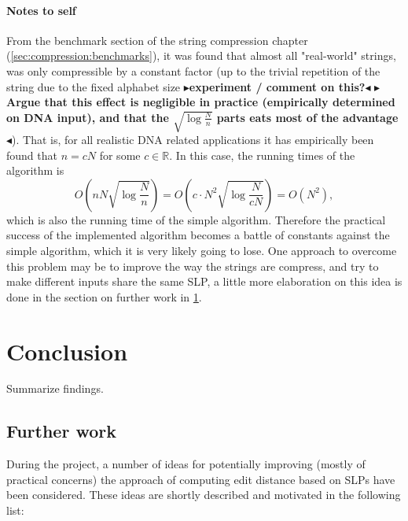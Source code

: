 \documentclass[twoside,11pt,openright]{report}
\newcommand{\todo}[1]{{\color[rgb]{.5,0,0}\textbf{$\blacktriangleright$#1$\blacktriangleleft$}}}
\begin{document}
\subsubsection{Notes to self}
From the benchmark section of the string compression chapter (\cref{sec:compression:benchmarks}), it was found that almost all "real-world" strings, was only compressible by a constant factor (up to the trivial repetition of the string due to the fixed alphabet size \todo{experiment / comment on this?} \todo{Argue that this effect is negligible in practice (empirically determined on DNA input), and that the $\sqrt{\log{\frac{N}{n}}}$ parts eats most of the advantage}). That is, for all realistic DNA related applications it has empirically been found that $n = cN$ for some $c \in \mathbb{R}$. In this case, the running times of the algorithm is
\[
  O\left( nN\sqrt{\log{\frac{N}{n}}} \right) = O\left( c \cdot N^2 \sqrt{\log{\frac{N}{cN}}} \right) = O(N^2),
\]
which is also the running time of the simple algorithm. Therefore the practical success of the implemented algorithm becomes a battle of constants against the simple algorithm, which it is very likely going to lose. One approach to overcome this problem may be to improve the way the strings are compress, and try to make different inputs share the same SLP, a little more elaboration on this idea is done in the section on further work in \cref{chapter:conclusion}.


\chapter{Conclusion}
\label{chapter:conclusion}
Summarize findings.

\section{Further work}
\label{sec:conclusion:further-work}
During the project, a number of ideas for potentially improving (mostly of practical concerns) the approach of computing edit distance based on SLPs have been considered. These ideas are shortly described and motivated in the following list:
\end{document}
